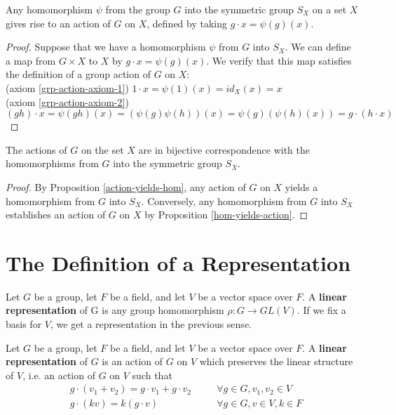 \begin{prop} \label{hom-yields-action}
Any homomorphism $\psi$ from the group $G$ into the symmetric group $S_X$ on a set $X$ gives rise to an action of $G$ on $X$, defined by taking $g \cdot x = \psi(g)(x)$.
\end{prop}
\begin{proof}
Suppose  that we have a homomorphism $\psi$ from $G$ into $S_X$.  We can define a map from $G \times X$ to $X$  by $g \cdot x = \psi(g)(x)$. We verify that this map satisfies the definition of a group action of $G$ on $X$:
\\ (axiom \ref{grp-action-axiom-1}) \quad $1 \cdot x = \psi(1)(x) = id_X(x) = x$
\\(axiom \ref{grp-action-axiom-2}) \quad $(gh) \cdot x = \psi(gh)(x) = (\psi(g)\psi(h))(x) = \psi(g)(\psi(h)(x)) = g \cdot (h \cdot x)$
\end{proof}

\begin{cor} \label{equivalence-of-actions}
The actions of $G$ on the set $X$ are in bijective correspondence with the homomorphisms from $G$ into the symmetric group $S_X$.
\end{cor}
\begin{proof}
By Proposition \ref{action-yields-hom}, any action of $G$ on $X$ yields a homomorphism from $G$ into $S_X$.    Conversely, any homomorphism from $G$ into $S_X$ establishes an action of $G$ on $X$ by Proposition \ref{hom-yields-action}.
\end{proof}


%
\section{The Definition of a Representation}
\begin{defn}
\label{rep-def-1}
Let $G$ be a group, let $F$ be a field, and let $V$ be a vector space over $F$.  A \textbf{linear representation} of G is any group homomorphism $\rho\colon G \to GL(V)$. If we fix a basis for $V$, we get a representation in the previous sense.\end{defn}


\begin{defn} \label{rep-def-2}Let $G$ be a group, let $F$ be a field, and let $V$ be a vector space over $F$. A \textbf{linear representation} of $G$ is an action of $G$ on $V$ which preserves the linear structure of $V$, i.e. an action of $G$ on $V$ such that
\begin{align}
\label{rep-axiom-1}&g \cdot (v_1+v_2)=g \cdot v_1+g \cdot v_2 \quad && \forall g \in G, v_1, v_2 \in V \\
\label{rep-axiom-2}&g \cdot (kv) = k (g \cdot v) \quad && \forall g \in G, v \in V, k \in F
\end{align}
 \end{defn}
 
